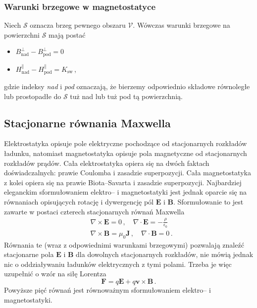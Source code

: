 \documentclass[../main.tex]{subfiles}
\begin{document}
\subsubsection{Warunki brzegowe w magnetostatyce}
Niech \(\mathcal{S}\) oznacza brzeg pewnego obszaru \(\mathcal{V}\). Wówczas warunki brzegowe na
powierzchni \(\mathcal{S}\) mają postać
\begin{itemize}
    \item \(B_\text{nad}^\perp-B_\text{pod}^\perp=0\)
    \item \(H^\parallel_\text{nad}-H^\parallel_\text{pod}=K_\text{sw}\)\,,
\end{itemize}
gdzie indeksy \textit{nad} i \textit{pod} oznaczają, że bierzemy odpowiednio składowe równoległe lub
prostopadłe do \(\mathcal{S}\) tuż nad lub tuż pod tą powierzchnią.
\newpage
\subsection{Stacjonarne równania Maxwella}
Elektrostatyka opisuje pole elektryczne pochodzące od stacjonarnych rozkładów ładunku, natomiast
magnetostatyka opisuje pola magnetyczne od stacjonarnych rozkładów prądów. Cała elektrostatyka
opiera się na dwóch faktach doświadczalnych: prawie Coulomba i zasadzie superpozycji. Cała
magnetostatyka z kolei opiera się na prawie Biota--Savarta i zasadzie superpozycji. Najbardziej
eleganckim sformułowaniem elektro-- i magnetostatyki jest jednak oparcie się na równaniach
opisujących rotację i dywergencję pól \(\mathbf{E}\) i \(\mathbf{B}\). Sformułowanie to jest zawarte
w postaci czterech stacjonarnych równań \mbox{Maxwella}
\begin{equation*}
    \begin{split}
        &\nabla\times\mathbf{E}=0\,,\quad\nabla\cdot\mathbf{E}=-\frac{\rho}{\epsilon_0}\\
        &\nabla\times\mathbf{B}=\mu_0\mathbf{J}\,,\quad\nabla\cdot\mathbf{B}=0\,.
    \end{split}
\end{equation*}
Równania te (wraz z odpowiednimi warunkami brzegowymi) pozwalają znaleźć stacjonarne pola
\(\mathbf{E}\) i \(\mathbf{B}\) dla dowolnych stacjonarnych rozkładów, nie mówią jednak nic o
oddziaływaniu ładunków elektrycznych z tymi polami. Trzeba je więc uzupełnić o wzór na siłę Lorentza
\begin{equation*}
    \mathbf{F}=q\mathbf{E}+q\mathbf{v}\times\mathbf{B}\,.
\end{equation*}
Powyższe pięć równań jest równoważnym sformułowaniem elektro-- i magnetostatyki.\\
\end{document}
